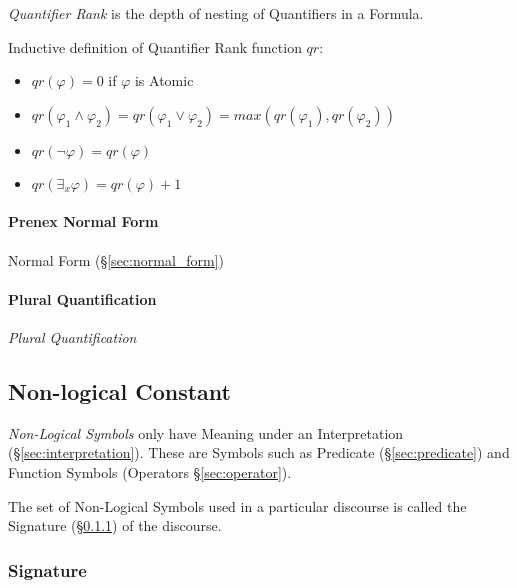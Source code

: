 \emph{Quantifier Rank} is the depth of nesting of Quantifiers in a
Formula.

Inductive definition of Quantifier Rank function $qr$:
\begin{itemize}
  \item $qr(\varphi) = 0$ if $\varphi$ is Atomic
  \item $qr(\varphi_1 \wedge \varphi_2) =
    qr(\varphi_1 \vee \varphi_2) = max(qr(\varphi_1),qr(\varphi_2))$
  \item $qr(\neg \varphi) = qr(\varphi)$
  \item $qr(\exists_x \varphi) = qr(\varphi) + 1$
\end{itemize}



\paragraph{Prenex Normal Form}\label{sec:prenex_normal}\hfill

Normal Form (\S\ref{sec:normal_form})



\paragraph{Plural Quantification}\label{sec:plural_quantification}
\hfill

\emph{Plural Quantification}



\subsection{Non-logical Constant}\label{sec:nonlogical_constant}

\emph{Non-Logical Symbols} only have Meaning under an Interpretation
(\S\ref{sec:interpretation}). These are Symbols such as Predicate
(\S\ref{sec:predicate}) and Function Symbols (Operators \S\ref{sec:operator}).

The set of Non-Logical Symbols used in a particular discourse is called the
Signature (\S\ref{sec:signature}) of the discourse.



\subsubsection{Signature}\label{sec:signature}


